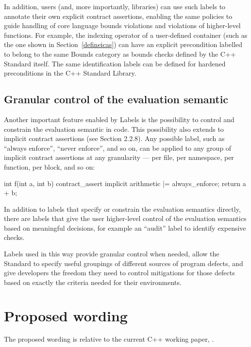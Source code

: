 In addition, users (and, more importantly, libraries) can use such labels to annotate their own explicit contract assertions, enabling the same policies to guide handling of core language bounds violations and violations of higher-level functions. For example, the indexing operator of a user-defined container (such as the one shown in Section~\ref{defineicas}) can have an explicit precondition labelled to belong to the same Bounds category as bounds checks defined by the C++ Standard itself. The same identification labels can be defined for hardened preconditions in the C++ Standard Library.

\subsection{Granular control of the evaluation semantic}
\label{semantic}

Another important feature enabled by Labels is the possibility to control and constrain the evaluation semantic in code. This possibility also extends to implicit contract assertions (see \cite{P3400R1} Section 2.2.8). Any possible label, such as ``always enforce'', ``never enforce'', and so on, can be applied to any group of implicit contract assertions at any granularity --- per file, per namespace, per function, per block, and so on:

\begin{codeblock}
int f(int a, int b) {
  contract_assert implicit arithmetic |= always_enforce;
  return a + b;
}
\end{codeblock}

In addition to labels that specify or constrain the evaluation semantics directly, there are labels that give the user higher-level control of the evaluation semantics based on meaningful decisions, for example an ``audit'' label to identify expensive checks.

Labels used in this way provide granular control when needed, allow the Standard to
specify useful groupings of different sources of program defects, and give developers the freedom they
need to control mitigations for those defects based on exactly the criteria needed for their environments.

\section{Proposed wording}
\label{wording}

The proposed wording is relative to the current C++ working paper, \cite{N5008}.

